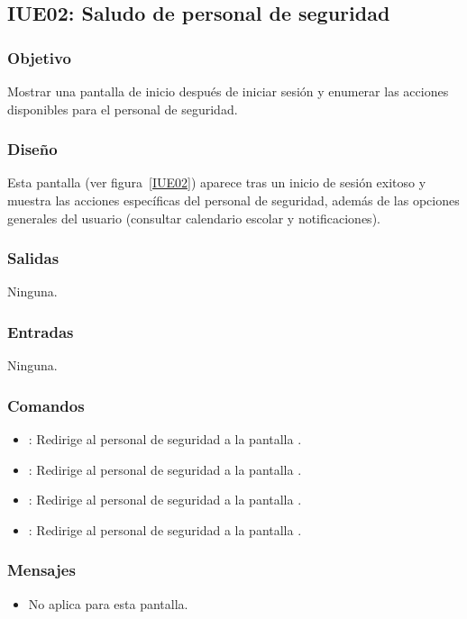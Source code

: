 \subsection{IUE02: Saludo de personal de seguridad}

\subsubsection{Objetivo}
Mostrar una pantalla de inicio después de iniciar sesión y enumerar las acciones disponibles para el personal de seguridad.

\subsubsection{Diseño}
Esta pantalla  (ver figura~\ref{IUE02}) aparece tras un inicio de sesión exitoso y muestra las acciones específicas del personal de seguridad, además de las opciones generales del usuario (consultar calendario escolar y notificaciones).


\subsubsection{Salidas}
Ninguna.

\subsubsection{Entradas}
Ninguna.

\subsubsection{Comandos}
\begin{itemize}
	\item {}: Redirige al personal de seguridad a la pantalla .
	\item {}: Redirige al personal de seguridad a la pantalla .
	\item {}: Redirige al personal de seguridad a la pantalla .
	\item {}: Redirige al personal de seguridad a la pantalla .
\end{itemize}

\subsubsection{Mensajes}
\begin{itemize}
	\item No aplica para esta pantalla.
\end{itemize}